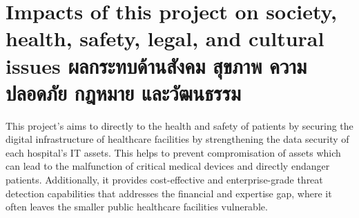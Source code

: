 \section{\ifenglish%
Impacts of this project on society, health, safety, legal, and cultural issues
\else%
ผลกระทบด้านสังคม สุขภาพ ความปลอดภัย กฎหมาย และวัฒนธรรม
\fi}

This project's aims to directly to the health and safety of patients by securing the digital infrastructure of healthcare facilities by strengthening the data security of each hospital's IT assets. This helps to prevent compromisation of assets which can lead to the malfunction of critical medical devices and directly endanger patients. Additionally, it provides cost-effective and enterprise-grade threat detection capabilities that addresses the financial and expertise gap, where it often leaves the smaller public healthcare facilities vulnerable.
